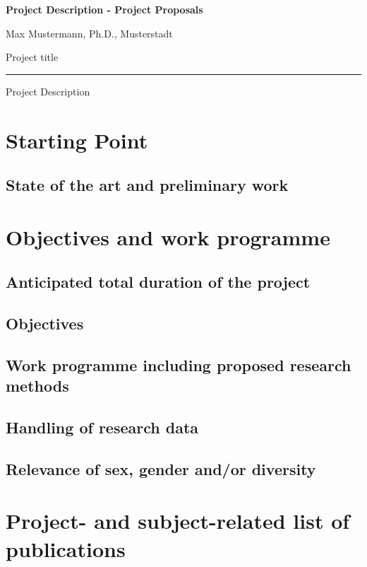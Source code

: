 \documentclass{scrartcl}
\newcommand{\applicants}{Max Mustermann, Ph.D., Musterstadt}
\newcommand{\project}{Project title}
\begin{document}
{\raggedright{} \normalsize \bfseries
	Project Description - Project Proposals \par
	\applicants{} \par
	\project{} \par
	\rule{\textwidth}{0.5pt} \par
	Project Description
}


\section{Starting Point}

\subsection*{State of the art and preliminary work}


\section{Objectives and work programme}

\subsection{Anticipated total duration of the project}

\subsection{Objectives}

\subsection{Work programme including proposed research methods}

\subsection{Handling of research data}

\subsection{Relevance of sex, gender and/or diversity}


\section{Project- and subject-related list of publications}
\end{document}
